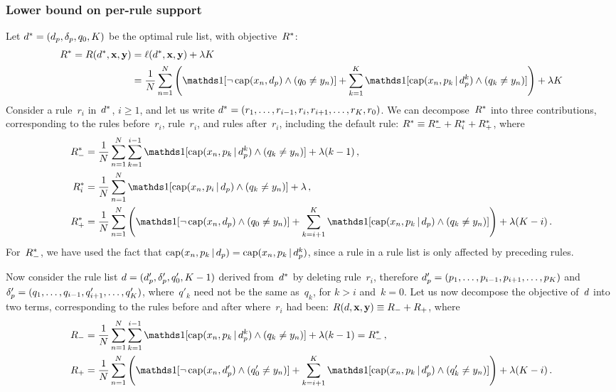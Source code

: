 \subsubsection{Lower bound on per-rule support}

Let ${d^* = (d_p, \delta_p, q_0, K)}$ be the optimal rule list,
with objective~$R^*$:
\begin{align}
\OptimalObj = \Obj(\OptimalRL, \x, \y) &= \Loss(\OptimalRL, \x, \y) + \Reg K \nn \\
&= \frac{1}{N} \sum_{n=1}^N \left( \one [ \neg\, \Cap(x_n, \Prefix) \wedge (\Default \neq y_n) ]
  + \sum_{k=1}^K \one [ \Cap(x_n, p_k \given \Prefix^k) \wedge (q_k \neq y_n) ] \right)
  + \Reg K
\end{align}
Consider a rule~$r_i$ in~$d^*$, ${i \ge 1}$, and let us write
${d^* = (r_1, \dots, r_{i-1}, r_i, r_{i+1}, \dots, r_K, r_0)}$.
%
We can decompose~$R^*$ into three contributions,
corresponding to the rules before~$r_i$, rule~$r_i$,
and rules after~$r_i$, including the default rule:
${R^* \equiv R^*_- + R^*_i + R^*_+}$, where
\begin{align*}
\OptimalObj_- &= \frac{1}{N} \sum_{n=1}^N \sum_{k=1}^{i-1}
  \one [ \Cap(x_n, p_k \given \Prefix^k) \wedge (q_k \neq y_n) ] + \Reg (k - 1) \,, \\
\OptimalObj_i &= \frac{1}{N} \sum_{n=1}^N
  \one [ \Cap(x_n, p_i \given \Prefix) \wedge (q_k \neq y_n) ] + \Reg \,, \nn \\
\OptimalObj_+ &= \frac{1}{N} \sum_{n=1}^N \left( \one [ \neg\, \Cap(x_n, \Prefix) \wedge (\Default \neq y_n) ]
  + \sum_{k=i+1}^K \one [ \Cap(x_n, p_k \given \Prefix) \wedge (q_k \neq y_n) ] \right)
  + \Reg (K - i) \,.
\end{align*}
For~$R^*_-$, we have used the fact that
${\text{cap}(x_n, p_k \,|\, d_p) = \text{cap}(x_n, p_k \,|\, d_p^k)}$,
since a rule in a rule list is only affected by preceding rules.

Now consider the rule list ${{d} =  (d_p', \delta_p', q_0', K-1)}$
derived from~$d^*$ by deleting rule~$r_i$,
therefore ${d_p' = (p_1, \dots, p_{i-1}, p_{i+1}, \dots, p_K)}$
and ${\delta_p' = (q_1, \dots, q_{i-1}, q'_{i+1}, \dots, q'_K)}$,
where~$q'_k$ need not be the same as~$q_k$, for ${k > i}$ and~${k = 0}$.
%
Let us now decompose the objective of~${d}$ into two terms,
corresponding to the rules before and after where~$r_i$ had been:
${R({d}, \mathbf{x}, \mathbf{y}) \equiv R_- + R_+}$, where
\begin{align*}
\Obj_- &= \frac{1}{N} \sum_{n=1}^N \sum_{k=1}^{i-1}
  \one [ \Cap(x_n, p_k \given \Prefix^k) \wedge (q_k \neq y_n) ] + \Reg (k - 1) = \OptimalObj_-  \,, \\
\Obj_+ &= \frac{1}{N} \sum_{n=1}^N
  \left( \one [ \neg\, \Cap(x_n, \Prefix') \wedge (\Default' \neq y_n) ]
  + \sum_{k=i+1}^K \one [ \Cap(x_n, p_k \given \Prefix') \wedge (q'_k \neq y_n) ] \right)
  + \Reg (K - i) \,.
\end{align*}

